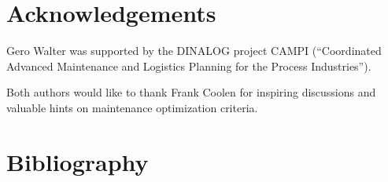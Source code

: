 \documentclass[authoryear]{elsarticle}
\begin{document}
\section*{Acknowledgements}

Gero Walter was supported by the DINALOG project CAMPI
(``Coordinated Advanced Maintenance and Logistics Planning for the Process Industries'').

Both authors would like to thank Frank Coolen for inspiring discussions
and valuable hints on maintenance optimization criteria.

\section*{Bibliography}




\end{document}
